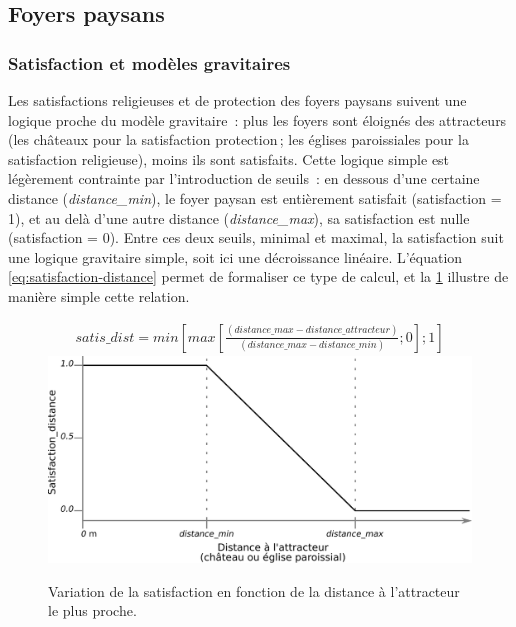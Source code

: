 %	
	
\subsection{Foyers paysans}

	\subsubsection{Satisfaction et modèles gravitaires \label{sssec:satisfaction}}
	
Les satisfactions religieuses et de protection des foyers paysans suivent une logique proche du modèle gravitaire : plus les foyers sont éloignés des \og attracteurs\fg{} (les châteaux pour la satisfaction \og protection\fg{} ; les églises paroissiales pour la satisfaction religieuse), moins ils sont satisfaits.
Cette logique simple est légèrement contrainte par l'introduction de seuils :
	 en dessous d'une certaine distance (\textit{distance\_min}), le foyer paysan est entièrement satisfait (satisfaction = 1), et au delà d'une autre distance (\textit{distance\_max}), sa satisfaction est nulle (satisfaction = 0).
Entre ces deux seuils, minimal et maximal, la satisfaction suit une logique gravitaire simple, soit ici une décroissance linéaire.
L'équation \ref{eq:satisfaction-distance} permet de formaliser ce type de calcul, et la \cref{fig:satisfaction-distance} illustre de manière simple cette relation.

\begin{figure}[H]
	\centering
	\begin{equation}\label{eq:satisfaction-distance}
	\begin{gathered}
	satis\_dist = min \left \lbrack max \left \lbrack \frac{(distance\_max - distance\_attracteur)}{(distance\_max -distance\_min)}; 0 \right \rbrack ; 1 \right \rbrack
	\end{gathered}
	\end{equation}
	\includegraphics[width=.8\linewidth]{img/satisfaction_distance.pdf}
	\caption{Variation de la satisfaction en fonction de la distance à l'attracteur le plus proche.}
	\label{fig:satisfaction-distance}
\end{figure}

